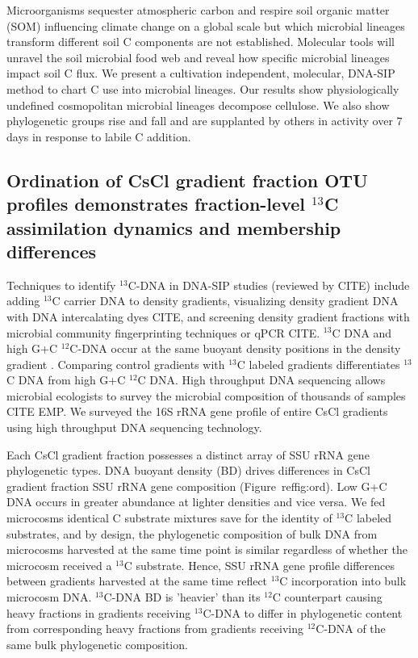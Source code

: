 Microorganisms sequester atmospheric carbon and respire soil organic matter
(SOM) influencing climate change on a global scale but which microbial lineages
transform different soil C components are not established. Molecular tools will
unravel the soil microbial food web and reveal how specific microbial lineages
impact soil C flux. We present a cultivation independent, molecular, DNA-SIP
method to chart C use into microbial lineages. Our results show physiologically
undefined cosmopolitan microbial lineages decompose cellulose. We also show
phylogenetic groups rise and fall and are supplanted by others in activity over
7 days in response to labile C addition.  


\subsection{Ordination of CsCl gradient fraction OTU profiles demonstrates
fraction-level $^{13}$C assimilation dynamics and membership differences}
Techniques to identify $^{13}$C-DNA in DNA-SIP studies (reviewed by CITE)
include adding $^{13}$C carrier DNA to density gradients, visualizing
density gradient DNA with DNA intercalating dyes CITE, and screening
density gradient fractions with microbial community fingerprinting
techniques or qPCR CITE. $^{13}$C DNA and high G+C $^{12}$C-DNA occur at
the same buoyant density positions in the density gradient
\citep{Buckley_2007}. Comparing control gradients with $^{13}$C labeled
gradients differentiates $^{13}$C DNA from high G+C $^{12}$C DNA. High
throughput DNA sequencing allows microbial ecologists to survey the
microbial composition of thousands of samples CITE EMP. We surveyed the
16S rRNA gene profile of entire CsCl gradients using high throughput DNA
sequencing technology.

Each CsCl gradient fraction possesses a distinct array of SSU rRNA gene
phylogenetic types. DNA buoyant density (BD) drives differences in CsCl
gradient fraction SSU rRNA gene composition (Figure~ref{fig:ord}). Low G+C
DNA occurs in greater abundance at lighter densities and vice versa. We
fed microcosms identical C substrate mixtures save for the identity of
$^{13}$C labeled substrates, and by design, the phylogenetic composition
of bulk DNA from microcosms harvested at the same time point is similar
regardless of whether the microcosm received a $^{13}$C substrate. Hence,
SSU rRNA gene profile differences between gradients harvested at the same
time reflect $^{13}$C incorporation into bulk microcosm DNA. $^{13}$C-DNA
BD is 'heavier' than its $^{12}$C counterpart causing heavy fractions in
gradients receiving $^{13}$C-DNA to differ in phylogenetic content from
corresponding heavy fractions from gradients receiving $^{12}$C-DNA of the
same bulk phylogenetic composition.

